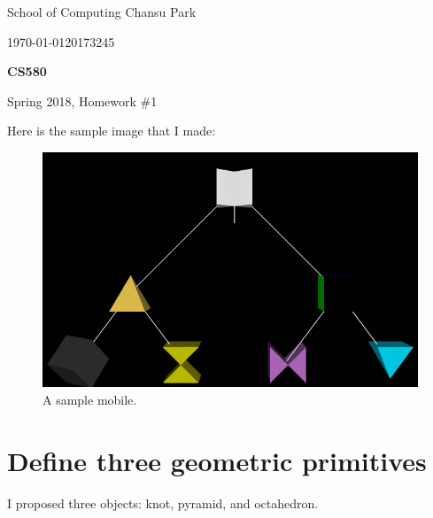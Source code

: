 \documentclass[11pt]{article}
\begin{document}
 



{\large
\noindent School of Computing %
\hfill Chansu Park %

\vspace{.1in}

\noindent \today \hfill 20173245}

\vspace{.25in}

\Large{
\begin{center}
\textbf{CS580}

Spring 2018, Homework \#1
\end{center}
}

\large

Here is the sample image that I made:
\begin{figure}[htb]
	\begin{center}
		\includegraphics[width=0.6\linewidth]{mobile.png}
	\end{center}
	\caption{A sample mobile.}
\end{figure}

\section{Define three geometric primitives} \label{sec:1}
I proposed three objects: knot, pyramid, and octahedron.
\end{document}
